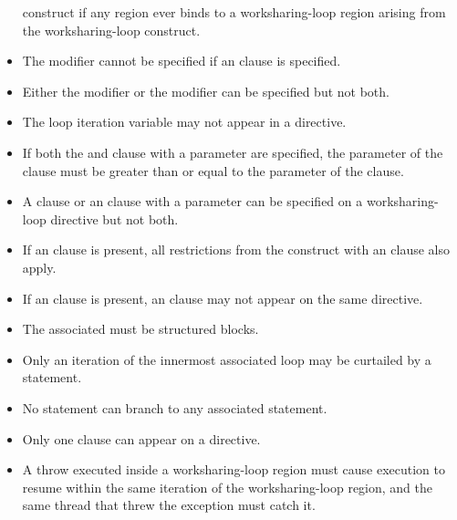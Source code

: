 \begin{itemize}
      construct if any  region ever binds to a worksharing-loop 
      region arising from the worksharing-loop construct.
\item The  modifier cannot be specified if an  
      clause is specified.
\item Either the  modifier or the  modifier 
      can be specified but not both.
\item The loop iteration variable may not appear in a  directive.
\item If both the  and  clause with a parameter 
      are specified, the parameter of the  clause must be greater 
      than or equal to the parameter of the  clause.
\item A  clause or an  clause with a parameter can
      be specified on a worksharing-loop directive but not both.
\item If an  clause is present, all restrictions from
      the  construct with an  clause also apply.
\item If an  clause is present, an 
      clause may not appear on the same directive.
\end{itemize}

\begin{ccppspecific}
\begin{itemize}
\item The associated  must be structured blocks.
\item Only an iteration of the innermost associated loop may be curtailed 
      by a  statement.
\item No statement can branch to any associated  statement.
\item Only one  clause can appear on a  directive.
\item A throw executed inside a worksharing-loop region must cause execution 
      to resume within the same iteration of the worksharing-loop region, 
      and the same thread that threw the exception must catch it.
\end{itemize}
\end{ccppspecific}

